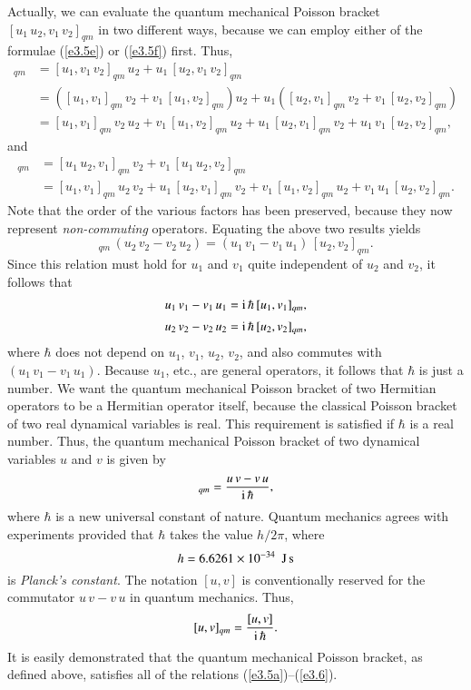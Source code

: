 Actually, we can evaluate the quantum mechanical Poisson bracket $[u_1 \,u_2, v_1 \,v_2]_{qm}$ in
two different ways, because we can employ either of the formulae (\ref{e3.5e}) or
(\ref{e3.5f}) first. Thus,
\begin{align}
[u_1\, u_2, v_1\, v_2]_{qm} &= [u_1, v_1 \,v_2]_{qm}\,u_2 + u_1\,[u_2, v_1\, v_2]_{qm}\nonumber\\[0.5ex]
&=\left([u_1, v_1]_{qm}\,v_2 + v_1\,[u_1, v_2]_{qm}\right) u_2 
+u_1\left([u_2, v_1]_{qm}\,v_2 + v_1\,[u_2, v_2]_{qm}\right)\nonumber\\[0.5ex]
&= [u_1, v_1]_{qm}\, v_2 \,u_2 + v_1\,[u_1, v_2]_{qm} \,u_2 + u_1\,[u_2, v_1]_{qm}\,v_2
+ u_1 \,v_1\,[u_2, v_2]_{qm},
\end{align}
and
\begin{align}
[u_1 \,u_2, v_1\, v_2]_{qm} &= [u_1 \,u_2, v_1 ]_{qm}\,v_2 + v_1\,[u_1\, u_2, v_2]_{qm}\nonumber\\[0.5ex]
&= [u_1, v_1]_{qm} \,u_2 \,v_2 + u_1\,[u_2, v_1]_{qm} \,v_2 + v_1\,[u_1, v_2]_{qm}\,u_2
+ v_1\, u_1\,[u_2, v_2]_{qm}.
\end{align}
Note that the order of the various factors has been preserved, because they
now represent {\em non-commuting}\/ operators. Equating the above two results
yields
\begin{equation}
[u_1, v_1]_{qm}\, (u_2 \,v_2 - v_2 \,u_2) = (u_1 \,v_1-v_1\, u_1)\,[u_2, v_2]_{qm}.
\end{equation}
Since this relation must hold for $u_1$ and $v_1$ quite independent of
$u_2$ and $v_2$, it follows that
\begin{align}
u_1 \,v_1 - v_1\, u_1 &= {\rm i}\,\hbar \,[u_1, v_1]_{qm},\\[0.5ex]
u_2\, v_2 - v_2\, u_2 &= {\rm i} \,\hbar \,[u_2, v_2]_{qm},
\end{align}
where $\hbar$ does not depend on $u_1$, $v_1$, $u_2$, $v_2$, and also
commutes with $(u_1\, v_1- v_1 \,u_1)$. Because $u_1$, {\rm etc.}, are  general
operators, it follows that $\hbar$ is just a number. We want the quantum 
mechanical Poisson
bracket of two Hermitian operators to be a Hermitian operator itself, because 
the classical Poisson bracket of two real dynamical variables is real. This
requirement is satisfied if $\hbar$ is a real number. Thus, the
quantum mechanical Poisson bracket of two dynamical variables $u$ and $v$
is given by
\begin{equation}
[u, v]_{qm} = \frac{u\,v - v\,u}{{\rm i} \,\hbar},
\end{equation}
where $\hbar$ is a new universal constant of nature. Quantum mechanics agrees with
experiments provided that  $\hbar$ takes the value $h/2\pi$, where
\begin{equation}
h = 6.6261 \times 10^{-34}~~{\rm J\,s}
\end{equation}
is {\em Planck's constant}. The notation
$[u, v]$ is
conventionally  reserved for the commutator $u\,v-v\,u$ in quantum mechanics. 
Thus,
\begin{equation}\label{e3.13}
[u, v]_{qm} = \frac{[u, v]}{{\rm i}\, \hbar}.
\end{equation}
It is easily demonstrated that the quantum mechanical Poisson bracket, as defined above,
satisfies all of the relations (\ref{e3.5a})--(\ref{e3.6}).

